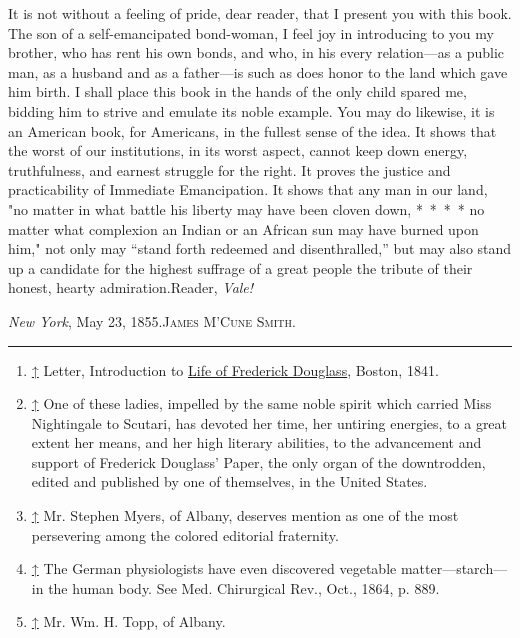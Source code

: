 It is not without a feeling of pride, dear reader, that I present you
with this book. The son of a self-emancipated bond-woman, I feel joy in
introducing to you my brother, who has rent his own bonds, and who, in
his every relation---as a public man, as a husband and as a father---is
such as does honor to the land which gave him birth. I shall place this
book in the hands of the only child spared me, bidding him to strive and
emulate its noble example. You may do likewise, it is an American book,
for Americans, in the fullest sense of the idea. It shows that the worst
of our institutions, in its worst aspect, cannot keep down energy,
truthfulness, and earnest struggle for the right. It proves the justice
and practicability of Immediate Emancipation. It shows that any man in
our land, "no matter in what battle his liberty may have been cloven
down, {*~*~*~*} no matter what complexion an Indian or an African sun
may have burned upon him," not only may ``stand forth redeemed and
disenthralled,'' but may also stand up a candidate for the highest
suffrage of a great people the tribute of their honest, hearty
admiration.{﻿}Reader, \emph{Vale!}

{﻿}\emph{New York}, May 23, 1855.{\textsc{James M'Cune Smith.}}

\begin{center}\rule{0.5\linewidth}{\linethickness}\end{center}

\begin{enumerate}
\item
  \hypertarget{cite_note-1}{}

  {\protect\hyperlink{cite_ref-1}{↑}} {Letter, Introduction to
  \href{/wiki/Life_of_Frederick_Douglass}{Life of Frederick Douglass},
  Boston, 1841.}
\item
  \hypertarget{cite_note-2}{}

  {\protect\hyperlink{cite_ref-2}{↑}} {One of these ladies, impelled by
  the same noble spirit which carried Miss Nightingale to Scutari, has
  devoted her time, her untiring energies, to a great extent her means,
  and her high literary abilities, to the advancement and support of
  Frederick Douglass' Paper, the only organ of the downtrodden, edited
  and published by one of themselves, in the United States.}
\item
  \hypertarget{cite_note-3}{}

  {\protect\hyperlink{cite_ref-3}{↑}} {Mr. Stephen Myers, of Albany,
  deserves mention as one of the most persevering among the colored
  editorial fraternity.}
\item
  \hypertarget{cite_note-4}{}

  {\protect\hyperlink{cite_ref-4}{↑}} {The German physiologists have
  even discovered vegetable matter---starch---in the human body. See
  Med. Chirurgical Rev., Oct., 1864, p. 889.}
\item
  \hypertarget{cite_note-5}{}

  {\protect\hyperlink{cite_ref-5}{↑}} {Mr. Wm. H. Topp, of Albany.}
\end{enumerate}

